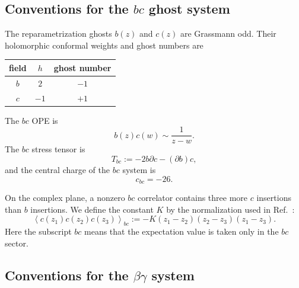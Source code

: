 \documentclass[12pt]{article}
\numberwithin{equation}{section}
\begin{document}
\subsection{Conventions for the \texorpdfstring{$bc$}{bc} ghost system}
\label{sec:bc-system}

The reparametrization ghosts $b(z)$ and $c(z)$ are Grassmann odd.
Their holomorphic conformal weights and ghost numbers are
\begin{center}
\begin{tabular}{ccc}
\toprule
field & $h$ & ghost number \\
\midrule
$b$ & $2$ & $-1$ \\
$c$ & $-1$ & $+1$ \\
\bottomrule
\end{tabular}
\end{center}
\medskip
The $bc$ OPE is
\begin{equation}
b(z)c(w)\sim\frac{1}{z-w}.
\label{eq:bc-data}
\end{equation}
The $bc$ stress tensor is
\begin{equation}
T_{bc}:=-2b\partial c-(\partial b)c,
\label{eq:Tbc-definition}
\end{equation}
and the central charge of the $bc$ system is
\begin{equation}
c_{bc}=-26.
\label{eq:cbc}
\end{equation}

On the complex plane, a nonzero $bc$ correlator contains three more $c$
insertions than $b$ insertions.  We define the
constant $K$ by the normalization used in Ref.~\cite{Barman:2026qzi}:
\begin{equation}
\left\langle c(z_1)c(z_2)c(z_3)\right\rangle_{bc}
:=-K(z_1-z_2)(z_2-z_3)(z_1-z_3).
\label{eq:ccc-normalization}
\end{equation}
Here the subscript $bc$ means that the expectation value is taken only in
the $bc$ sector.

\subsection{Conventions for the \texorpdfstring{$\beta\gamma$}{beta-gamma} system}
\label{sec:beta-gamma}
\end{document}
